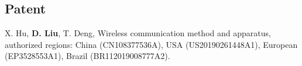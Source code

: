 \documentclass[a4paper,10pt]{article}
\begin{document}

\begin{bibunit}
  \renewcommand\refname{Recent Publications (or see more at \href{https://scholar.google.com/citations?hl=en&user=eK9LoQMAAAAJ&view_op=list_works&sortby=pubdate}{my Scholar})}
  \nocite{
    liu2020region,
    liu2020alpha,
    zuxing2020cdc,
    anubhad2020,
    andrea2020,
    liu2020powering,
    honore2020hidden,
    liu2020neural,
    chatterjee2019ssfn,
    liu2019discontinuous,
    liu2019entropy,
    liu2019alpha,
    liu2019dominant,
    liu2018will}
  \footnotesize{\putbib[../bibfile]}
\end{bibunit}

\subsection{Patent}
 X. Hu, \textbf{D. Liu}, T. Deng, Wireless communication method and apparatus, authorized regions: China (CN108377536A), USA (US20190261448A1), European (EP3528553A1), Brazil (BR112019008777A2).

\end{document}
